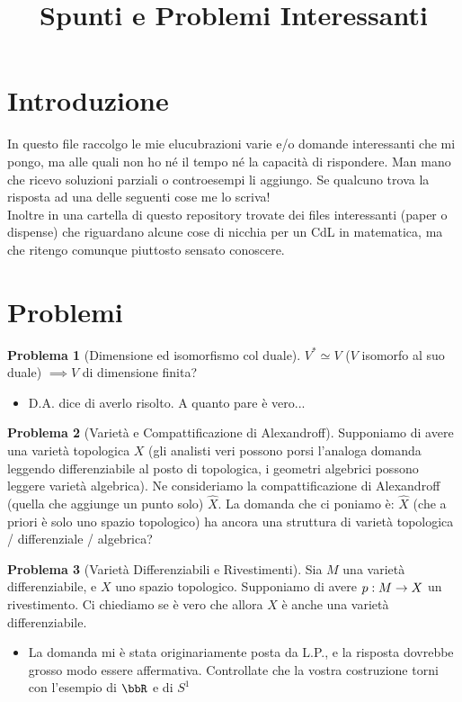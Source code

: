 \documentclass[a4paper,NoNotes,GeneralMath]{stdmdoc}
\theoremstyle{definition}
\newtheorem{problema}{Problema}
\begin{document}
	\title{Spunti e Problemi Interessanti}
	\autodate

	\section {Introduzione}
	In questo file raccolgo le mie elucubrazioni varie e/o domande interessanti che mi pongo, ma alle quali non ho né il tempo né la capacità di rispondere. Man mano che ricevo soluzioni parziali o controesempi li aggiungo. Se qualcuno trova la risposta ad una delle seguenti cose me lo scriva! \\
	Inoltre in una cartella di questo repository trovate dei files interessanti (paper o dispense) che riguardano alcune cose di nicchia per un CdL in matematica, ma che ritengo comunque piuttosto sensato conoscere.

	\section {Problemi}
	\begin{problema}[Dimensione ed isomorfismo col duale]
		$V^{*} \simeq V$ ($V$ isomorfo al suo duale) $\implies V$ di dimensione finita?
		\begin{itemize}
			\item D.A. dice di averlo risolto. A quanto pare è vero...
		\end{itemize}
	\end{problema}
	
	\begin{problema}[Varietà e Compattificazione di Alexandroff]
		Supponiamo di avere una varietà topologica $X$ (gli analisti veri possono porsi l'analoga domanda leggendo differenziabile al posto di topologica, i geometri algebrici possono leggere varietà algebrica). Ne consideriamo la compattificazione di Alexandroff (quella che aggiunge un punto solo) $\hat{X}$. La domanda che ci poniamo è: $\hat{X}$ (che a priori è solo uno spazio topologico) ha ancora una struttura di varietà topologica / differenziale / algebrica?
	\end{problema}
	
	\begin{problema}[Varietà Differenziabili e Rivestimenti]
		Sia $M$ una varietà differenziabile, e $X$ uno spazio topologico. Supponiamo di avere $p: M \rightarrow X$ un rivestimento. Ci chiediamo se è vero che allora $X$ è anche una varietà differenziabile.
		\begin{itemize}
			\item La domanda mi è stata originariamente posta da L.P., e la risposta dovrebbe grosso modo essere affermativa. Controllate che la vostra costruzione torni con l'esempio di $\bbR$ e di $S^1$
		\end{itemize}
	\end{problema}
	
\end{document}
